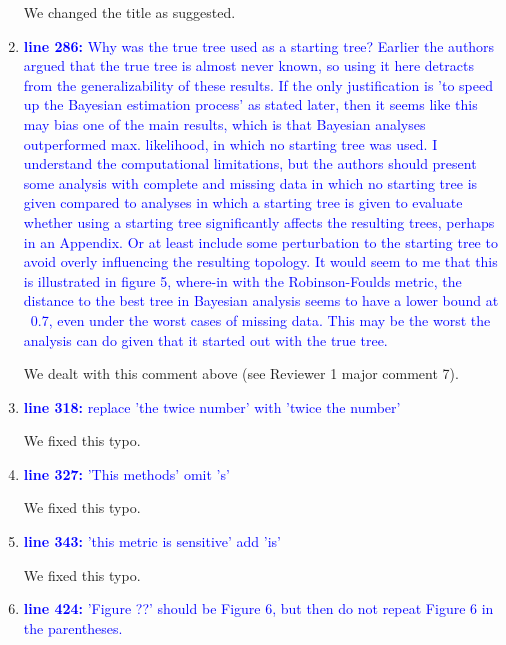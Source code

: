 \documentclass[12pt,letterpaper]{article}
\begin{document}
\begin{enumerate}
We changed the title as suggested.

\item{\textcolor{blue}{\textbf{line 286:} Why was the true tree used as a starting tree? Earlier the authors argued that the true tree is almost never known, so using it here detracts from the generalizability of these results. If the only justification is 'to speed up the Bayesian estimation process' as stated later, then it seems like this may bias one of the main results, which is that Bayesian analyses outperformed max. likelihood, in which no starting tree was used. I understand the computational limitations, but the authors should present some analysis with complete and missing data in which no starting tree is given compared to analyses in which a starting tree is given to evaluate whether using a starting tree significantly affects the resulting trees, perhaps in an Appendix. Or at least include some perturbation to the starting tree to avoid overly influencing the resulting topology. It would seem to me that this is illustrated in figure 5, where-in with the Robinson-Foulds metric, the distance to the best tree in Bayesian analysis seems to have a lower bound at ~0.7, even under the worst cases of missing data. This may be the worst the analysis can do given that it started out with the true tree. }}

We dealt with this comment above (see Reviewer 1 major comment 7).

\item{\textcolor{blue}{\textbf{line 318:} replace 'the twice number' with 'twice the number'}}

We fixed this typo.

\item{\textcolor{blue}{\textbf{line 327:} 'This methods' omit 's'}}

We fixed this typo.

\item{\textcolor{blue}{\textbf{line 343:} 'this metric is sensitive' add 'is'}}

We fixed this typo.

\item{\textcolor{blue}{\textbf{line 424:} 'Figure ??' should be Figure 6, but then do not repeat Figure 6 in the parentheses. }}


\end{enumerate}
\end{document}
